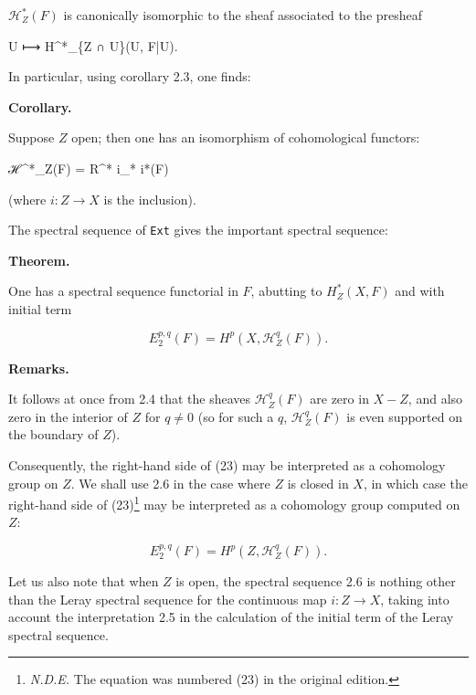 \documentclass[
  11pt,
  a4paper,
]{book}
\newenvironment{Shaded}{}{}
\newcommand{\NormalTok}[1]{#1}
\begin{document}
\(\mathcal{H}^{*}_{Z}(F)\) is canonically isomorphic to the sheaf
associated to the presheaf

\begin{Shaded}
\begin{Highlighting}[]
\NormalTok{U ⟼ H\^{}*\_\{Z ∩ U\}(U, F|U).}
\end{Highlighting}
\end{Shaded}

In particular, using corollary 2.3, one finds:

\textbf{Corollary.}

Suppose \(Z\) open; then one has an isomorphism of cohomological
functors:

\begin{Shaded}
\begin{Highlighting}[]
\NormalTok{ℋ\^{}*\_Z(F) = R\^{}* i\_* i*(F)}
\end{Highlighting}
\end{Shaded}

(where \(i: Z \to X\) is the inclusion).

The spectral sequence of \texttt{Ext} gives the important spectral
sequence:

\textbf{Theorem.}

One has a spectral sequence functorial in \(F\), abutting to
\(H^{*}_{Z}(X, F)\) and with initial term

\[ E^{p,q}_{2}(F) = H^{p}(X, \mathcal{H}^{q}_{Z}(F)). \]

\textbf{Remarks.}

It follows at once from 2.4 that the sheaves \(\mathcal{H}^{q}_{Z}(F)\)
are zero in \(X - Z\), and also zero in the interior of \(Z\) for
\(q \neq 0\) (so for such a \(q\), \(\mathcal{H}^{q}_{Z}(F)\) is even
supported on the boundary of \(Z\)).

Consequently, the right-hand side of (23) may be interpreted as a
cohomology group on \(Z\). We shall use 2.6 in the case where \(Z\) is
closed in \(X\), in which case the right-hand side of (23)\footnote{\emph{N.D.E.}
  The equation was numbered (23) in the original edition.} may be
interpreted as a cohomology group computed on \(Z\):

\[ E^{p,q}_{2}(F) = H^{p}(Z, \mathcal{H}^{q}_{Z}(F)). \]

Let us also note that when \(Z\) is open, the spectral sequence 2.6 is
nothing other than the Leray spectral sequence for the continuous map
\(i: Z \to X\), taking into account the interpretation 2.5 in the
calculation of the initial term of the Leray spectral sequence.
\end{document}
